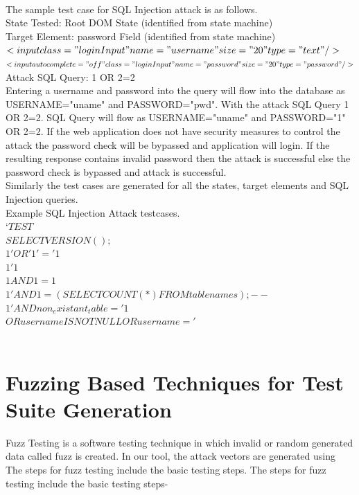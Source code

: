 \\
The sample test case for SQL Injection attack is as follows. 
\\
State Tested: Root DOM State (identified from state machine)\\
Target Element: password Field  (identified from state machine)\\
$
<input class="loginInput" name="username" size="20" type="text"/>$\\
$<input autocomplete="off" class="loginInput" name="password" size="20" type="password"/>$
\\
Attack SQL Query: 1 OR 2=2\\
\newline
Entering a username and password into the query will flow into the database as USERNAME="uname" and PASSWORD="pwd". With the attack SQL Query 1 OR 2=2. SQL Query will flow as USERNAME="uname" and PASSWORD="1" OR 2=2.
If the web application does not have security measures to control the attack the password check will be bypassed and application will login. If the resulting response contains invalid password then the attack is successful else the password check is bypassed and attack is successful.
\\
\newline
Similarly the test cases are generated for all the states, target elements and SQL Injection queries.
\\
\newline
Example SQL Injection Attack testcases.\\
$‘TEST$\\
$SELECT VERSION();$\\
$1' OR '1'='1$\\
$1'1$\\
$1 AND 1=1$\\
$1' AND 1=(SELECT COUNT(*) FROM tablenames); --$\\
$1' AND non_existant_table = '1$\\
$OR username IS NOT NULL OR username = '$\\

 \\
\section{Fuzzing Based Techniques for Test Suite Generation}

Fuzz Testing is a software testing technique in which invalid or random generated data called fuzz is created. In our tool, the attack vectors are generated using The steps for fuzz testing include the basic testing steps. The steps for fuzz testing include the basic testing steps-

